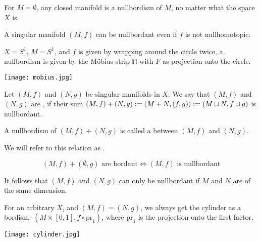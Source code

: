 \documentclass[a4paper,11pt]{article}
\begin{document}
\begin{example}
    For \(M=\emptyset\), any closed manifold is a nullbordism of \(M\), no matter what the space \(X\) is.%
\end{example}

\begin{observation}
    A singular manifold \((M,f)\) can be nullbordant even if \(f\) is not nullhomotopic.
\end{observation}

\begin{example}
    \(X=S^1\), \(M=S^1\), and \(f\) is given by wrapping around the circle twice, a nullbordism is given by the M\"obius strip \(\mathbb{M}\) with \(F\) as projection onto the circle.\begin{center} \texttt{[image: mobius.jpg]} \end{center}
\end{example}


\begin{definition}\label{bordant}
    Let \((M,f)\) and \((N,g)\) be singular manifolds in \(X\). We say that \((M,f)\) and \((N,g)\) are , if their sum \((M,f)+(N,g):=(M+N, (f,g)):=(M\sqcup N, f\sqcup g)\) is nullbordant.

    A nullbordism of \((M,f)+(N,g)\) is called a  between \((M,f)\) and \((N,g)\).
\end{definition}

We will refer to this relation as .

\begin{remark}
    \[(M,f)+(\emptyset,g) \text{ are bordant} \iff (M,f) \text{ is nullbordant}\]
\end{remark}

\begin{remark}
    It follows that \((M,f)\) and \((N,g)\) can only be nullbordant if \(M\) and \(N\) are of the same dimension.
\end{remark}

\begin{example}[Cylinder]\label{cylinder bordism}
    For an arbitrary \(X\), and \((M,f)=(N,g)\), we always get the cylinder as a bordism: \((M\times[0,1],f\circ\mathrm{pr}_1)\), where \(\mathrm{pr}_1\) is the projection onto the first factor.
    \begin{center}
        \texttt{[image: cylinder.jpg]}
    \end{center}
\end{example}
\end{document}
